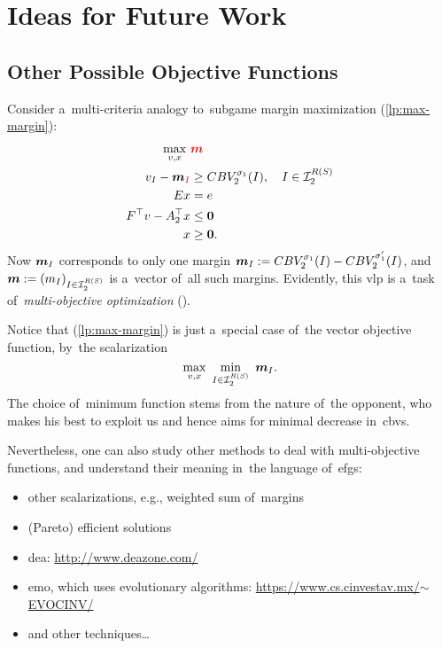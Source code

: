 \chapter{Ideas for Future Work}
\todo

\section{Other Possible Objective Functions}
Consider a~multi-criteria analogy to~subgame margin maximization (\ref{lp:max-margin}):
\begin{equation}
  \label{vlp:max-margins}
  \begin{split}
    \max_{v, x}\ &\textcolor{red}{\boldsymbol{m}} \\
    v_I - \boldsymbol{m}_{\textcolor{red}{I}} &\ge CBV_2^{\sigma_1}(I), \quad I \in \mathcal{I}_2^{R(S)}\\ 
    Ex &= e \\
    F^\top v - A_2^\top x &\le \boldsymbol{0} \\
    x &\ge \boldsymbol{0}.
  \end{split}
\end{equation}
Now $\boldsymbol{m}_I$ corresponds to only one margin $\boldsymbol{m}_I := CBV_2^{\sigma_1} (I) - CBV_2^{\sigma_1'} (I)$, and $\boldsymbol{m} := (m_I) _{I\in\mathcal{I}_2^{R(S)}}$ is a~vector of~all such margins.
Evidently, this \acrfull{vlp} is a~task of~\emph{multi-objective optimization} (\cite{Ehrgott2006multicriteria, Grygarova1996zaklady}).

Notice that (\ref{lp:max-margin}) is just a~special case of~the vector objective function, by~the scalarization
\[
  \max_{v, x}\ \min_{I \in \I_2^{R(S)}}\ {\vect{m}_I}.
\]
The choice of~minimum function stems from the nature of~the opponent, who makes his best to exploit us and hence aims for minimal decrease in~\acrshort{cbv}s.

Nevertheless, one can also study other methods to deal with multi-objective functions, and understand their meaning in~the language of~\acrshort{efg}s:
\begin{itemize}
  \item other scalarizations, e.g., weighted sum of~margins
  \item (Pareto) efficient solutions
  \item \acrfull{dea}:
    \href{http://www.deazone.com/}{http://www.deazone.com/}
  \item \acrfull{emo}, which uses evolutionary algorithms:
    \href{https://www.cs.cinvestav.mx/~EVOCINV/}{https://www.cs.cinvestav.mx/$\sim$EVOCINV/} %
  \item and other techniques\ldots
\end{itemize}
